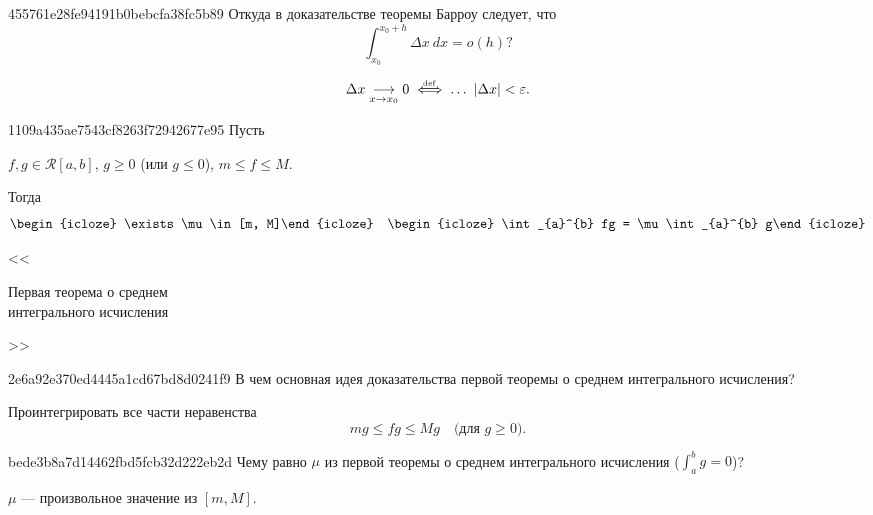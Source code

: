 \begin{note}{455761e28fe94191b0bebcfa38fc5b89}
    Откуда в доказательстве теоремы Барроу следует, что
    \[
        \int_{x_0}^{x_0 + h} \Delta x\: dx = o(h)?
    \]

    \begin{cloze}{1}
        \[
            \Delta x \underset{x \to x_0}\longrightarrow 0 \overset{\hspace{-1pt}\text{\tiny def}}\iff \dots \ \left\lvert \Delta x \right\rvert <  \varepsilon.
        \]
    \end{cloze}
\end{note}

\begin{note}{1109a435ae7543cf8263f72942677e95}
    Пусть \begin{icloze}{2}\({ f, g \in \mathcal R[a, b] }\), \({ g \geqslant 0 }\) (или \({ g \leqslant 0 }\)), \({ m \leqslant f \leqslant M }\).\end{icloze}
    Тогда
    \[
        \begin{icloze}{4}\exists \mu \in [m, M]\end{icloze} \quad \begin{icloze}{1}\int_{a}^{b} fg = \mu \int_{a}^{b} g\end{icloze}
    \]

    \begin{center}
        \tiny
        <<\begin{icloze}{3}Первая теорема о среднем \\\phantom{<<}интегрального исчисления\end{icloze}>>
    \end{center}
\end{note}

\begin{note}{2e6a92e370ed4445a1cd67bd8d0241f9}
    В чем основная идея доказательства первой теоремы о среднем интегрального исчисления?

    \begin{cloze}{1}
        Проинтегрировать все части неравенства
        \[
            mg \leqslant fg \leqslant Mg \quad \text{(для \({ g \geqslant 0 }\))}.
        \]
    \end{cloze}
\end{note}

\begin{note}{bede3b8a7d14462fbd5fcb32d222eb2d}
    Чему равно \({ \mu }\) из первой теоремы о среднем интегрального исчисления (\({ \int_{a}^{b} g = 0 }\))?

    \begin{cloze}{1}
        \({ \mu }\) --- произвольное значение из \({ [m, M] }\).
    \end{cloze}
\end{note}

